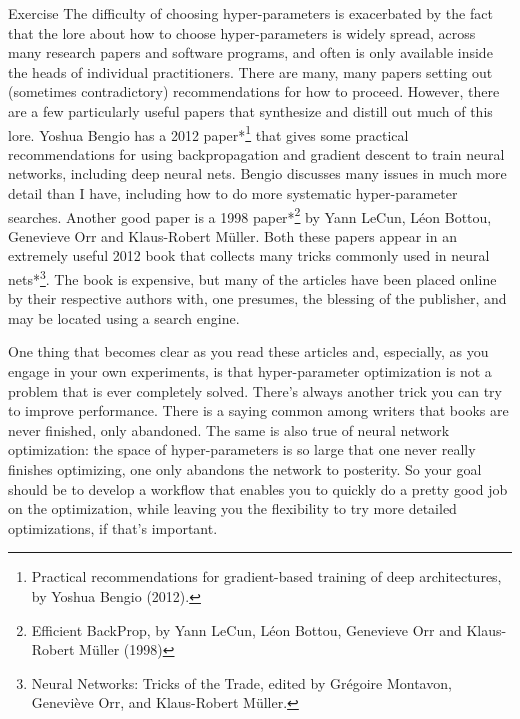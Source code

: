 \begin{exerciseBox}{Exercise}
The difficulty of choosing hyper-parameters is exacerbated by the fact that the lore about how to choose hyper-parameters is widely spread, across many research papers and software programs, and often is only available inside the heads of individual practitioners. There are many, many papers setting out (sometimes contradictory) recommendations for how to proceed. However, there are a few particularly useful papers that synthesize and distill out much of this lore. Yoshua Bengio has a 2012 paper*\footnote{Practical recommendations for gradient-based training of deep architectures, by Yoshua Bengio (2012).} that gives some practical recommendations for using backpropagation and gradient descent to train neural networks, including deep neural nets. Bengio discusses many issues in much more detail than I have, including how to do more systematic hyper-parameter searches. Another good paper is a 1998 paper*\footnote{Efficient BackProp, by Yann LeCun, Léon Bottou, Genevieve Orr and Klaus-Robert Müller (1998)} by Yann LeCun, Léon Bottou, Genevieve Orr and Klaus-Robert Müller. Both these papers appear in an extremely useful 2012 book that collects many tricks commonly used in neural nets*\footnote{Neural Networks: Tricks of the Trade, edited by Grégoire Montavon, Geneviève Orr, and Klaus-Robert Müller.}. The book is expensive, but many of the articles have been placed online by their respective authors with, one presumes, the blessing of the publisher, and may be located using a search engine.


One thing that becomes clear as you read these articles and, especially, as you engage in your own experiments, is that hyper-parameter optimization is not a problem that is ever completely solved. There's always another trick you can try to improve performance. There is a saying common among writers that books are never finished, only abandoned. The same is also true of neural network optimization: the space of hyper-parameters is so large that one never really finishes optimizing, one only abandons the network to posterity. So your goal should be to develop a workflow that enables you to quickly do a pretty good job on the optimization, while leaving you the flexibility to try more detailed optimizations, if that's important.



\end{exerciseBox}

